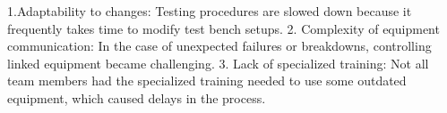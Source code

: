 1.Adaptability to changes: Testing procedures are slowed down because it frequently takes time to modify test bench setups.
2. Complexity of equipment communication: In the case of unexpected failures or breakdowns, controlling linked equipment became challenging.
3. Lack of specialized training: Not all team members had the specialized training needed to use some outdated equipment, which caused delays in the process.

